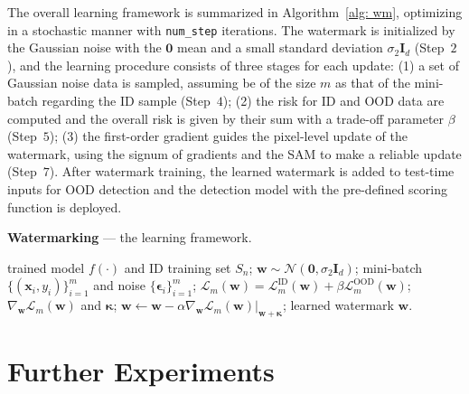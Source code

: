 \documentclass{article}
\begin{document}
The overall learning framework is summarized in Algorithm~\ref{alg: wm}, optimizing in a stochastic manner with \texttt{num\_step} iterations. The watermark is initialized by the Gaussian noise with the $\boldsymbol{0}$ mean and a small standard deviation $\sigma_2\mathbf{I}_d$ (Step~$2$), and the learning procedure consists of three stages for each update: (1) a set of Gaussian noise data is sampled, assuming be of the size $m$ as that of the mini-batch regarding the ID sample (Step~$4$); (2) the risk for ID and OOD data are computed and the overall risk is given by their sum with a trade-off parameter $\beta$ (Step~$5$); (3) the first-order gradient guides the pixel-level update of the watermark, using the signum of gradients and the SAM to make a reliable update (Step~$7$). After watermark training, the learned watermark is added to test-time inputs for OOD detection and the detection model with the pre-defined scoring function is deployed.

\begin{algorithm}[t]  
\caption{\textbf{Watermarking} --- the learning framework.} 
\label{alg: wm}
\begin{algorithmic}[1]
 trained model $f(\cdot)$ and ID training set $S_n$;
\State $\boldsymbol{w}\sim\mathcal{N}(\boldsymbol{0},\sigma_2 \mathbf{I}_d)$; \Comment{\textcolor{blue}{watermark initialization}}
    \State mini-batch $\{(\boldsymbol{x}_i, y_i)\}_{i=1}^m$ and noise $\{\boldsymbol{\epsilon}_i\}_{i=1}^m$; \Comment{\textcolor{blue}{data sampling}}
    \State $\mathcal{L}_m(\boldsymbol{w})=\mathcal{L}_m^\text{ID}(\boldsymbol{w})+\beta \mathcal{L}_m^\text{OOD}(\boldsymbol{w})$;
    \Comment{\textcolor{blue}{risk calculation}}
     \State $\nabla_{\boldsymbol{w}}\mathcal{L}_m(\boldsymbol{w})$ and $\boldsymbol{\kappa}$;
    \Comment{\textcolor{blue}{gradient calculation}}
    \State $\boldsymbol{w}\leftarrow \boldsymbol{w} - \alpha \nabla_{\boldsymbol{w}}\mathcal{L}_m(\boldsymbol{w})\lvert_{\boldsymbol{w}+\boldsymbol{\kappa}}$;
    \Comment{\textcolor{blue}{watermark updating}}
\EndFor
{} learned watermark $\boldsymbol{w}$. 
\end{algorithmic}
 \end{algorithm}


\section{Further Experiments} \label{sec: app exp}
\end{document}
